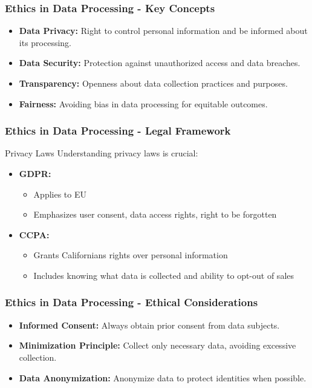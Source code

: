 \documentclass[aspectratio=169]{beamer}
\begin{document}
\begin{frame}[fragile]
    \frametitle{Ethics in Data Processing - Key Concepts}
    \begin{itemize}
        \item \textbf{Data Privacy:} Right to control personal information and be informed about its processing.
        \item \textbf{Data Security:} Protection against unauthorized access and data breaches.
        \item \textbf{Transparency:} Openness about data collection practices and purposes.
        \item \textbf{Fairness:} Avoiding bias in data processing for equitable outcomes.
    \end{itemize}
\end{frame}

\begin{frame}[fragile]
    \frametitle{Ethics in Data Processing - Legal Framework}
    \begin{block}{Privacy Laws}
        Understanding privacy laws is crucial:
    \end{block}
    \begin{itemize}
        \item \textbf{GDPR:} 
        \begin{itemize}
            \item Applies to EU
            \item Emphasizes user consent, data access rights, right to be forgotten
        \end{itemize}
        \item \textbf{CCPA:} 
        \begin{itemize}
            \item Grants Californians rights over personal information
            \item Includes knowing what data is collected and ability to opt-out of sales
        \end{itemize}
    \end{itemize}
\end{frame}

\begin{frame}[fragile]
    \frametitle{Ethics in Data Processing - Ethical Considerations}
    \begin{itemize}
        \item \textbf{Informed Consent:} Always obtain prior consent from data subjects.
        \item \textbf{Minimization Principle:} Collect only necessary data, avoiding excessive collection.
        \item \textbf{Data Anonymization:} Anonymize data to protect identities when possible.
    \end{itemize}
\end{frame}
\end{document}
